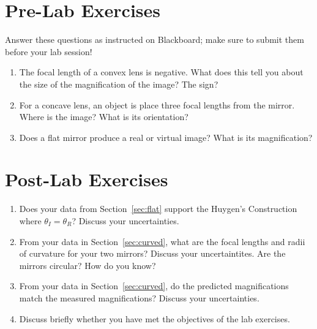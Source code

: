\documentclass[12pt]{article}
\begin{document}
\newpage
 
\section*{Pre-Lab Exercises}

Answer these questions as instructed on Blackboard; make sure to
submit them before your lab session!

\begin{enumerate}
\item The focal length of a convex lens is negative.  What does this
  tell you about the size of the magnification of the image?  The
  sign? 
\item For a concave lens, an object is place three focal lengths from
  the mirror.  Where is the image?  What is its orientation?
\item Does a flat mirror produce a real or virtual image?  What is its
  magnification? 
\end{enumerate}

\newpage

\section*{Post-Lab Exercises}

\begin{enumerate}
\item Does your data from Section~\ref{sec:flat} support the Huygen's
  Construction where $\theta_I = \theta_R$?  Discuss your
  uncertainties.
\item From your data in Section~\ref{sec:curved}, what are the focal
  lengths and radii of curvature for your two mirrors?  Discuss your
  uncertaintites.  Are the mirrors circular?  How do you know?
\item From your data in Section~\ref{sec:curved}, do the predicted
  magnifications match the measured magnifications?  Discuss your
  uncertainties. 
\item Discuss briefly whether you have met the objectives of the lab
  exercises.
\end{enumerate}
\end{document}
